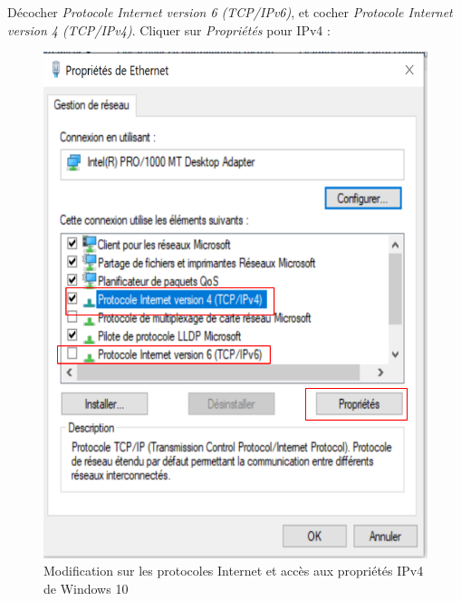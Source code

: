 \newpage
Décocher \textit{Protocole Internet version 6 (TCP/IPv6)}, et cocher \textit{Protocole Internet version 4 (TCP/IPv4)}. Cliquer sur \textit{Propriétés} pour IPv4 :
\begin{figure}[h!]
	\begin{center}
		\includegraphics[scale=0.8]{W_Screenshots/44.png}
		\caption{Modification sur les protocoles Internet et accès aux propriétés IPv4 de Windows 10}
		\label{W_Screenshots/44}
	\end{center}
\end{figure}
\FloatBarrier

